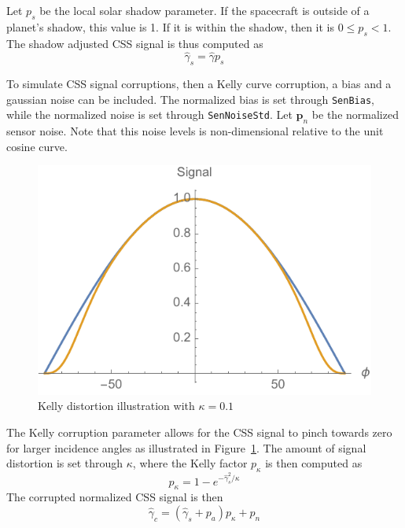 \documentclass[]{BasiliskReportMemo}
\begin{document}
Let $p_{s}$ be the local solar shadow parameter.  If the spacecraft is outside of a planet's shadow, this value is 1.  If it is within the shadow, then it is $0\le p_{s} < 1$.  The shadow adjusted CSS signal is thus computed as 
\begin{equation}
	\hat{\gamma}_{s} = \hat{\gamma} p_{s}
\end{equation}


To simulate CSS signal corruptions, then a Kelly curve corruption, a bias and a gaussian noise can be included.  The normalized bias is set through {\tt SenBias}, while the normalized noise is set through {\tt SenNoiseStd}.   Let $\bm p_{n}$ be the normalized sensor noise.  Note that this noise levels is non-dimensional relative to the unit cosine curve.  

\begin{figure}[htb]
	\centerline{
	\includegraphics[]{Figures/kelly}
	}
	\caption{Kelly distortion illustration with $\kappa = 0.1$}
	\label{fig:kelly}
\end{figure}
The Kelly corruption parameter allows for the CSS signal to pinch towards zero for larger incidence angles as illustrated in Figure~\ref{fig:kelly}.  The amount of signal distortion is set through $\kappa$, where the Kelly factor $p_{\kappa}$ is then computed as 
\begin{equation}
	p_{\kappa} = 1 - e^{-\hat\gamma_{s}^{2}/\kappa}
\end{equation}
The corrupted normalized CSS signal is then
\begin{equation}
	\hat \gamma_{c} = (\hat\gamma_{s} + p_{a}) p_{\kappa} + p_{n}
\end{equation}
\end{document}
